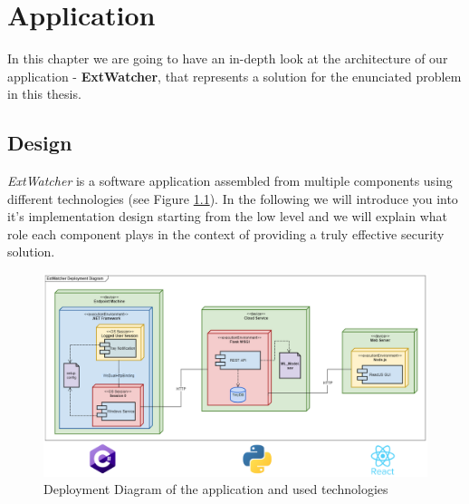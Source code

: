 \chapter{Application}
\label{chapter:application}
In this chapter we are going to have an in-depth look at the architecture of our application - \textbf{ExtWatcher}, that represents a solution for the enunciated problem in this thesis.


\section{Design}
\label{section:design}
\textit{ExtWatcher} is a software application assembled from multiple components using different technologies (see Figure \ref{deployment}). In the following we will introduce you into it's implementation design starting from the low level and we will explain what role each component plays in the context of providing a truly effective security solution. 

\begin{figure}[H]
	\centerline{\includegraphics[scale=0.4]{figures/deployTech.png}}  
	\caption{Deployment Diagram of the application and used technologies}
	\label{deployment}
\end{figure}

